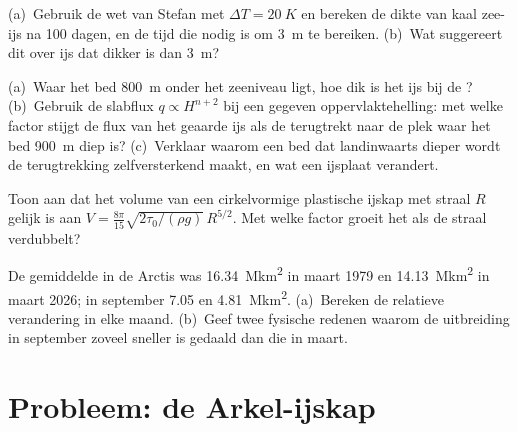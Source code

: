 \begin{exercise}[$\star\star$]\label{exo:b3:glaciology:9}
(a)~Gebruik de wet van Stefan met $\Delta T = \qty{20}{K}$ en bereken de dikte
van kaal zee-ijs na 100 dagen, en de tijd die nodig is om \qty{3}{m} te bereiken.
(b)~Wat suggereert dit over ijs dat dikker is dan \qty{3}{m}?
\end{exercise}

\begin{exercise}[$\star\star\star$]\label{exo:b3:glaciology:10}
(a)~Waar het bed \qty{800}{m} onder het zeeniveau ligt, hoe dik is het ijs bij
de ? (b)~Gebruik de slabflux $q \propto H^{n+2}$ bij een gegeven
oppervlaktehelling: met welke factor stijgt de flux van het geaarde ijs als de
 terugtrekt naar de plek waar het bed \qty{900}{m} diep is? (c)~Verklaar
waarom een bed dat landinwaarts dieper wordt de terugtrekking zelfversterkend maakt, en wat een
ijsplaat verandert.
\end{exercise}

\begin{exercise}[$\star\star\star$]\label{exo:b3:glaciology:11}
Toon aan dat het volume van een cirkelvormige plastische ijskap met straal $R$ gelijk is aan $V =
\frac{8\pi}{15}\sqrt{2\tau_0/(\rho g)}\,R^{5/2}$. Met welke factor groeit het
 als de straal verdubbelt?
\end{exercise}

\begin{exercise}[$\star\star\star$]\label{exo:b3:glaciology:12}
De gemiddelde  in de Arctis was \qty{16.34}{\mega km^2} in maart 1979 en
\qty{14.13}{\mega km^2} in maart 2026; in september \num{7.05} en
\qty{4.81}{\mega km^2}. (a)~Bereken de relatieve verandering in elke maand.
(b)~Geef twee fysische redenen waarom de uitbreiding in september zoveel sneller is gedaald
dan die in maart.
\end{exercise}

\section{Probleem: de Arkel-ijskap}

